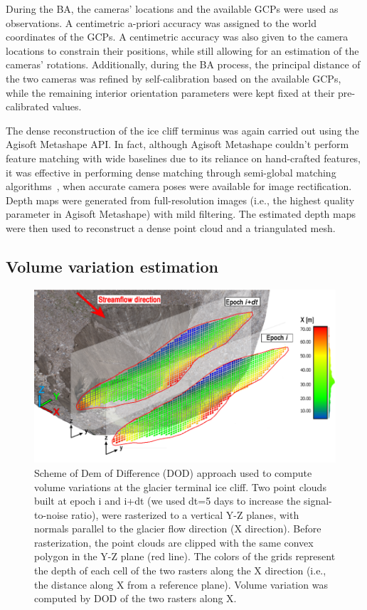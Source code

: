 During the BA, the cameras' locations and the available GCPs were used as observations.
A centimetric a-priori accuracy was assigned to the world coordinates of the GCPs.
A centimetric accuracy was also given to the camera locations to constrain their
positions, while still allowing for an estimation of the cameras' rotations.
Additionally, during the BA process, the principal distance of the
two cameras was refined by self-calibration based on the available GCPs, while the
remaining interior orientation parameters were kept fixed at their pre-calibrated values.

The dense reconstruction of the ice cliff terminus was again carried out using the
Agisoft Metashape API.
In fact, although Agisoft Metashape couldn't perform feature matching with wide baselines
due to its reliance on hand-crafted features, it was effective in performing dense
matching through semi-global matching
algorithms~\citep{Hirschmuller2012}, when accurate camera poses were available for image
rectification.
Depth maps were generated from full-resolution images (i.e., the highest
quality parameter in Agisoft Metashape) with mild filtering.
The estimated depth maps were then used to reconstruct a dense point cloud and a
triangulated mesh.


\subsection{Volume variation estimation}\label{sec:4:volumevariation}

\begin{figure}
\centering
  \includegraphics[width=1.0\linewidth]{3_dod_scheme.png}
  \caption{Scheme of Dem of Difference (DOD) approach used to compute volume variations
    at the glacier terminal ice cliff.
    Two point clouds built at epoch i and i+dt (we used dt=5 days to increase the
    signal-to-noise ratio), were rasterized to a vertical Y-Z planes, with normals
    parallel to the glacier flow direction (X direction).
    Before rasterization, the point clouds are clipped with the same convex polygon in
    the Y-Z plane (red line).
    The colors of the grids represent the depth of each cell of the two rasters along the
    X direction (i.e., the distance along X from a reference plane).
    Volume variation was computed by DOD of the two rasters along X.}
  \label{fig:4:dod_scheme}
\end{figure}

